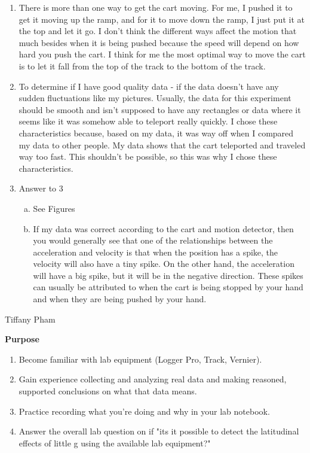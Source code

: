 \documentclass[idxtotoc,hyperref,openany]{labbook} %
\begin{document}

\begin{enumerate}
    \item There is more than one way to get the cart moving. For me, I pushed it to get it moving up the ramp, and for it to move down the ramp, I just put it at the top and let it go. I don't think the different ways affect the motion that much besides when it is being pushed because the speed will depend on how hard you push the cart. I think for me the most optimal way to move the cart is to let it fall from the top of the track to the bottom of the track.
    \item To determine if I have good quality data - if the data doesn't have any sudden fluctuations like my pictures. Usually, the data for this experiment should be smooth and isn't supposed to have any rectangles or data where it seems like it was somehow able to teleport really quickly. I chose these characteristics because, based on my data, it was way off when I compared my data to other people. My data shows that the cart teleported and traveled way too fast. This shouldn't be possible, so this was why I chose these characteristics.
    \item Answer to 3
    \begin{enumerate}[(a)]
        \item See Figures
        \item If my data was correct according to the cart and motion detector, then you would generally see that one of the relationships between the acceleration and velocity is that when the position has a spike, the velocity will also have a tiny spike. On the other hand, the acceleration will have a big spike, but it will be in the negative direction. These spikes can usually be attributed to when the cart is being stopped by your hand and when they are being pushed by your hand.
    \end{enumerate}
\end{enumerate}


\vspace{-5mm}
Tiffany Pham

\vspace{-5mm}
\hfill \break
\textbf{Purpose}
\begin{enumerate}
    \item Become familiar with lab equipment (Logger Pro, Track, Vernier).
    \item Gain experience collecting and analyzing real data and making reasoned, supported conclusions on what that data means.
    \item Practice recording what you're doing and why in your lab notebook.
    \item Answer the overall lab question on if "its it possible to detect the latitudinal effects of little g using the available lab equipment?"
\end{enumerate}
\end{document}
